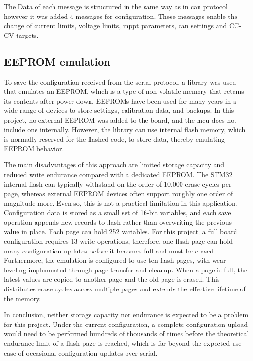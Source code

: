         The Data of each message is structured in the same way as in \ac{can} protocol however it was added 4 messages for configuration. These messages enable the change of current limits, voltage limits, \ac{mppt} parameters, \ac{can} settings and CC-CV targets.
        

    \subsection{EEPROM emulation}
        To save the configuration received from the serial protocol, a library was used that emulates an EEPROM, which is a type of non-volatile memory that retains its contents after power down. EEPROMs have been used for many years in a wide range of devices to store settings, calibration data, and backups. In this project, no external EEPROM was added to the board, and the \ac{mcu} does not include one internally. However, the library can use internal flash memory, which is normally reserved for the flashed code, to store data, thereby emulating EEPROM behavior.

        The main disadvantages of this approach are limited storage capacity and reduced write endurance compared with a dedicated EEPROM. The STM32 internal flash can typically withstand on the order of 10,000 erase cycles per page, whereas external EEPROM devices often support roughly one order of magnitude more. Even so, this is not a practical limitation in this application. Configuration data is stored as a small set of 16-bit variables, and each save operation appends new records to flash rather than overwriting the previous value in place. Each page can hold 252 variables. For this project, a full board configuration requires 13 write operations, therefore, one flash page can hold many configuration updates before it becomes full and must be erased. Furthermore, the emulation is configured to use ten flash pages, with wear leveling implemented through page transfer and cleanup. When a page is full, the latest values are copied to another page and the old page is erased. This distributes erase cycles across multiple pages and extends the effective lifetime of the memory.

        In conclusion, neither storage capacity nor endurance is expected to be a problem for this project. Under the current configuration, a complete configuration upload would need to be performed hundreds of thousands of times before the theoretical endurance limit of a flash page is reached, which is far beyond the expected use case of occasional configuration updates over serial.

